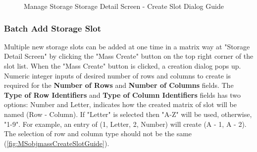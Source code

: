 \begin{figure}[htb]
	\centering
    \hspace{10pt}
  
    \vspace{10pt}
    
    \caption{Manage Storage Storage Detail Screen - Create Slot Dialog Guide}
	\label{fig:MSobjCreateSlotGuide}
\end{figure}


\subsubsection{Batch Add Storage Slot}
\label{subsubsec:batchAddSlot}

Multiple new storage slots can be added at one time in a matrix way at "Storage Detail Screen" by clicking the "Mass Create" button on the top right corner of the slot list.
When the "Mass Create" button is clicked, a creation dialog pops up. Numeric integer inputs of desired number of rows and columns to create is required for the \textbf{Number of Rows} and \textbf{Number of Columns} fields. The \textbf{Type of Row Identifiers} and \textbf{Type of Column Identifiers} fields has two options: Number and Letter, indicates how the created matrix of slot will be named (Row - Column). If "Letter" is selected then "A-Z" will be used, otherwise, "1-9". For example, an entry of (1, Letter, 2, Number) will create (A - 1, A - 2). The selection of row and column type should not be the same (\autoref{fig:MSobjmassCreateSlotGuide}).

